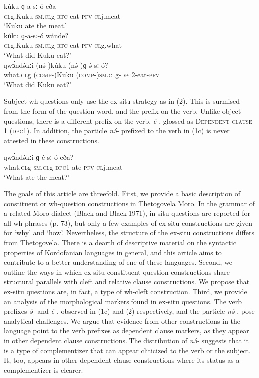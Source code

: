 \ea
\ea	\gll kúku         ɡ-a-sː-ó               	eða\\
	\textsc{cl}g.Kuku   \textsc{sm.cl}g-\textsc{rtc}-eat-\textsc{pfv}	\textsc{cl}j.meat     	\\		     	     \trans ‘Kuku ate the meat.’\\
\ex	\gll kúku	ɡ-a-sː-ó	wánde?\\
	\textsc{cl}g.Kuku	\textsc{sm.cl}g-\textsc{rtc}-eat-\textsc{pfv}   	\textsc{cl}g.what\\
	\trans ‘What did Kuku eat?’\\
\ex	\gll ŋwɜ́ndə́kːi	(nə́-)kúku     	(nə́-)ɡ-ə́-sː-ó?                \\
	what.\textsc{cl}g	(\textsc{comp-})Kuku  	(\textsc{comp-})\textsc{sm.cl}g-\textsc{dpc}2-eat-\textsc{pfv}  \\
	\trans ‘What did Kuku eat?’\\
\z
\z

Subject wh-questions only use the ex-situ strategy as in (2). This is surmised from the form of the question word, and the prefix on the verb. Unlike object questions, there is a different prefix on the verb, \textit{é-}, glossed as \textsc{Dependent clause} 1 (\textsc{dpc}1). In addition, the particle \textit{nə́-} prefixed to the verb in (1c) is never attested in these constructions. 

\ea
\ea		\gll ŋwɜ́ndə́kːi	ɡ-é-sː-ó        	eða?		\\
what.\textsc{cl}g	\textsc{sm.cl}g-\textsc{dpc}1-ate-\textsc{pfv}	\textsc{cl}j.meat\\
\trans		‘What ate the meat?’	\\
\z
\z

The goals of this article are threefold. First, we provide a basic description of constituent or wh-question constructions in Thetogovela Moro. In the grammar of a related Moro dialect (Black and Black 1971), in-situ questions are reported for all wh-phrases (p. 73), but only a few examples of ex-situ constructions are given for ‘why’ and ‘how’. Nevertheless, the structure of the ex-situ constructions differs from Thetogovela. There is a dearth of descriptive material on the syntactic properties of Kordofanian languages in general, and this article aims to contribute to a better understanding of one of these languages. Second, we outline the ways in which ex-situ constituent question constructions share structural parallels with cleft and relative clause constructions. We propose that ex-situ questions are, in fact, a type of wh-cleft construction. Third, we provide an analysis of the morphological markers found in ex-situ questions.  The verb prefixes \textit{ə́-} and \textit{é-}, observed in (1c) and (2) respectively, and the particle \textit{nə́-}, pose analytical challenges. We argue that evidence from other constructions in the language point to the verb prefixes as dependent clause markers, as they appear in other dependent clause constructions. The distribution of \textit{nə́-} suggests that it is a type of complementizer that can appear cliticized to the verb or the subject. It, too, appears in other dependent clause constructions where its status as a complementizer is clearer. 

